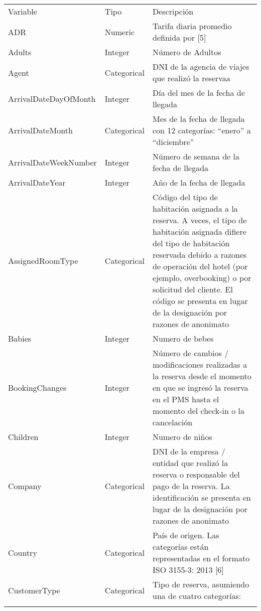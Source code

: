 \documentclass[
]{book}
\begin{document}
\begin{longtable}[]{@{}
  >{\centering\arraybackslash}p{}
  >{\centering\arraybackslash}p{}
  >{\centering\arraybackslash}p{}@{}}
\toprule
Variable & Tipo & Descripción \\ \addlinespace
\midrule
\endhead
ADR & Numeric & Tarifa diaria promedio definida por {[}5{]} \\ \addlinespace
Adults & Integer & Número de Adultos \\ \addlinespace
Agent & Categorical & DNI de la agencia de viajes que realizó la reservaa \\ \addlinespace
ArrivalDateDayOfMonth & Integer & Día del mes de la fecha de llegada \\ \addlinespace
ArrivalDateMonth & Categorical & Mes de la fecha de llegada con 12 categorías: ``enero'' a ``diciembre'' \\ \addlinespace
ArrivalDateWeekNumber & Integer & Número de semana de la fecha de llegada \\ \addlinespace
ArrivalDateYear & Integer & Año de la fecha de llegada \\ \addlinespace
AssignedRoomType & Categorical & Código del tipo de habitación asignada a la reserva. A veces, el tipo de habitación asignada difiere del tipo de habitación reservada debido a razones de operación del hotel (por ejemplo, overbooking) o por solicitud del cliente. El código se presenta en lugar de la designación por razones de anonimato \\ \addlinespace
Babies & Integer & Numero de bebes \\ \addlinespace
BookingChanges & Integer & Número de cambios / modificaciones realizadas a la reserva desde el momento en que se ingresó la reserva en el PMS hasta el momento del check-in o la cancelación \\ \addlinespace
Children & Integer & Numero de niños \\ \addlinespace
Company & Categorical & DNI de la empresa / entidad que realizó la reserva o responsable del pago de la reserva. La identificación se presenta en lugar de la designación por razones de anonimato \\ \addlinespace
Country & Categorical & País de origen. Las categorías están representadas en el formato ISO 3155-3: 2013 {[}6{]} \\ \addlinespace
CustomerType & Categorical & Tipo de reserva, asumiendo una de cuatro categorías: \\ \addlinespace

\end{longtable}
\end{document}
